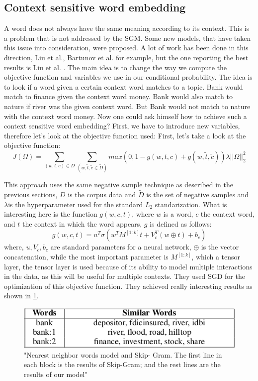 \subsection{Context sensitive word embedding}
A word does not always have the same meaning according to its context. This is a problem that is not addressed by the SGM. Some new models, that have taken this issue into consideration, were proposed. A lot of work has been done in this direction, Liu et al.\cite{topicalWE},  Bartunov et al.\cite{breaking} for example, but the one reporting the best results is Liu et al. \cite{contextWithTensor}. The main idea is to change the way we compute the objective function and variables we use in our conditional probability. The idea is to look if a word given a certain context word matches to a topic. Bank would match to finance given the context word money. Bank would also match to nature if river was the given context word. But Bank would not match to nature with the context word money. Now one could ask himself how to achieve such a context sensitive word embedding? First, we have to introduce new variables, therefore let's look at the objective function used: 
First, let's take a look at the objective function:
\begin{equation}
J(\Omega) = \sum_{(w,t,c)\in D} \sum_{(w,\tilde{t},\tilde{c} \in{\tilde{D}})} max(0,1- g(w,t,c) + g(w,\tilde{t},\tilde{c})) \lambda||\Omega||_{2}^2
\end{equation}

This approach uses the same negative sample technique as described in the previous sections, $D$ is the corpus data and $\tilde{D}$ is the set of negative samples and $\lambda$is the hyperparameter used for the standard $L_2$ standarization. What is interesting here is the function $g(w,c,t)$, where $w$ is a word, $c$ the context word, and $t$ the context in which the word appears, $g$ is defined as follows: 
\begin{equation}
g(w,c,t) = u^T \sigma(w^TM^{[1:k]}t+V_c^T(w \oplus t) + b_c)
\end{equation}
where, $u, V_c, b_c$ are standard parameters for a neural network, $\oplus$ is the vector concatenation, while the most important parameter is $M^{[1:k]}$, which a tensor layer, the tensor layer is used because of its ability to model multiple interactions in the data, as this will be useful for multiple contexts. They used SGD for the optimization of this objective function.  They achieved really interesting results as shown in \ref{fig:multipleContext}.
\begin{figure}[ht]
    \centering
            \includegraphics[scale=0.7]{images/multipleContext.png} 
    \caption{"Nearest neighbor words model and Skip-
Gram. The first line in each block is the results of Skip-Gram;
and the rest lines are the results of our model" \cite{contextWithTensor}}
    \label{fig:multipleContext}
\end{figure}

